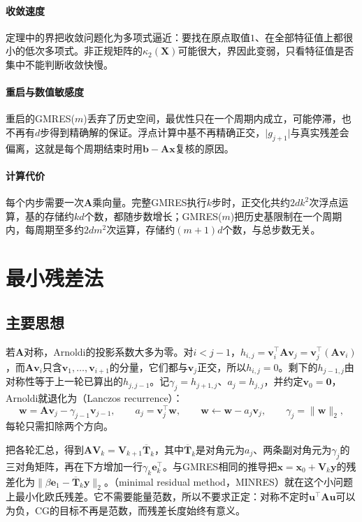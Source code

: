 \paragraph{收敛速度}
定理中的界把收敛问题化为多项式逼近：要找在原点取值$1$、在全部特征值上都很小的低次多项式。非正规矩阵的$\kappa_2(\bm X)$可能很大，界因此变弱，只看特征值是否集中不能判断收敛快慢。

\paragraph{重启与数值敏感度}
重启的GMRES($m$)丢弃了历史空间，最优性只在一个周期内成立，可能停滞，也不再有$d$步得到精确解的保证。浮点计算中基不再精确正交，$\lvert g_{j+1}\rvert$与真实残差会偏离，这就是每个周期结束时用$\bm b-\bm A\bm x$复核的原因。

\paragraph{计算代价}
每个内步需要一次$\bm A$乘向量。完整GMRES执行$k$步时，正交化共约$2dk^2$次浮点运算，基的存储约$kd$个数，都随步数增长；GMRES($m$)把历史基限制在一个周期内，每周期至多约$2dm^2$次运算，存储约$(m+1)d$个数，与总步数无关。

\section{最小残差法}
\label{sec:ls-minres}

\subsection{主要思想}

若$\bm A$对称，Arnoldi的投影系数大多为零。对$i<j-1$，$h_{i,j}=\bm v_i^\top\bm A\bm v_j=\bm v_j^\top(\bm A\bm v_i)$，而$\bm A\bm v_i$只含$\bm v_1,\ldots,\bm v_{i+1}$的分量，它们都与$\bm v_j$正交，所以$h_{i,j}=0$。剩下的$h_{j-1,j}$由对称性等于上一轮已算出的$h_{j,j-1}$。记$\gamma_j=h_{j+1,j}$、$a_j=h_{j,j}$，并约定$\bm v_0=\bm0$，Arnoldi就退化为（Lanczos recurrence）：
\[
 \bm w=\bm A\bm v_j-\gamma_{j-1}\bm v_{j-1},\qquad a_j=\bm v_j^\top\bm w,\qquad
 \bm w\leftarrow\bm w-a_j\bm v_j,\qquad \gamma_j=\lVert\bm w\rVert_2 ,
\]
每轮只需扣除两个方向。

把各轮汇总，得到$\bm A\bm V_k=\bm V_{k+1}\overline{\bm T}_k$，其中$\overline{\bm T}_k$是对角元为$a_j$、两条副对角元为$\gamma_j$的三对角矩阵，再在下方增加一行$\gamma_k\bm e_k^\top$。与GMRES相同的推导把$\bm x=\bm x_0+\bm V_k\bm y$的残差化为$\lVert\beta\bm e_1-\overline{\bm T}_k\bm y\rVert_2$。（minimal residual method，MINRES）就在这个小问题上最小化欧氏残差。它不需要能量范数，所以不要求正定：对称不定时$\bm u^\top\bm A\bm u$可以为负，CG的目标不再是范数，而残差长度始终有意义。

